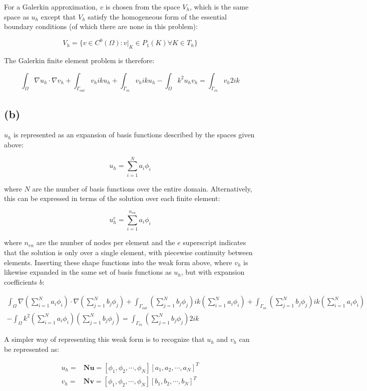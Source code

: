 \documentclass[10pt]{article}
\newcommand{\beq}{\begin{equation}}
\newcommand{\eeq}{\end{equation}}
\newcommand{\beqa}{\begin{equation}\begin{aligned}}
\newcommand{\eeqa}{\end{aligned}\end{equation}}
\begin{document}
For a Galerkin approximation, \(v\) is chosen from the space \(V_h\), which is the same space as \(u_h\) except that \(V_h\) satisfy the homogeneous form of the essential boundary conditions (of which there are none in this problem):

\beq
V_h=\{v\in C^0(\Omega):v\rvert_K\in P_1(K)\forall K\in T_h\}
\eeq

The Galerkin finite element problem is therefore:

\beq
\int_{\Omega}\nabla u_h\cdot\nabla v_h+\int_{\Gamma_{out}}v_hiku_h+\int_{\Gamma_{in}}v_hiku_h-\int_{\Omega}k^2u_hv_h=\int_{\Gamma_{in}}v_h2ik
\eeq

\subsection{(b)}

\(u_h\) is represented as an expansion of basis functions described by the spaces given above:

\beq
u_h=\sum_{i=1}^{N}a_i\phi_i
\eeq

where \(N\) are the number of basis functions over the entire domain. Alternatively, this can be expressed in terms of the solution over each finite element:

\beq
u_h^e=\sum_{i=1}^{n_{en}}a_i\phi_i
\eeq

where \(n_{en}\) are the number of nodes per element and the \(e\) superscript indicates that the solution is only over a single element, with piecewise continuity between elements. Inserting these shape functions into the weak form above, where \(v_h\) is likewise expanded in the same set of basis functions as \(u_h\), but with expansion coefficients \(b\):

\beqa
\int_{\Omega}\nabla \left(\sum_{i=1}^{N}a_i\phi_i\right)\cdot\nabla \left(\sum_{j=1}^{N}b_j\phi_j\right)+\int_{\Gamma_{out}}\left(\sum_{j=1}^{N}b_j\phi_j\right)ik\left(\sum_{i=1}^{N}a_i\phi_i\right)+\int_{\Gamma_{in}}\left(\sum_{j=1}^{N}b_j\phi_j\right)ik\left(\sum_{i=1}^{N}a_i\phi_i\right)\\
-\int_{\Omega}k^2\left(\sum_{i=1}^{N}a_i\phi_i\right)\left(\sum_{j=1}^{N}b_j\phi_j\right)=\int_{\Gamma_{in}}\left(\sum_{j=1}^{N}b_j\phi_j\right)2ik
\eeqa

A simpler way of representing this weak form is to recognize that \(u_h\) and \(v_h\) can be represented as:

\beqa
u_h=&\textbf{N}\textbf{u}=\left\lbrack\phi_1, \phi_2, \cdots, \phi_N\right\rbrack\left\lbrack a_1, a_2, \cdots, a_N\right\rbrack^T\\
v_h=&\textbf{N}\textbf{v}=\left\lbrack\phi_1, \phi_2, \cdots, \phi_N\right\rbrack\left\lbrack b_1, b_2, \cdots, b_N\right\rbrack^T\\
\eeqa
\end{document}
